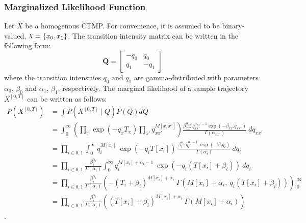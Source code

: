 \subsubsection{Marginalized Likelihood Function} 
Let $ X $ be a homogenous CTMP. For convenience, it is assumed to be binary-valued, $ \rchi = \left\lbrace x_{0}, x_{1} \right\rbrace $. The transition intensity matrix can be written in the following form:
\begin{equation}
\textbf{Q} = 
\begin{bmatrix}
-q_{0} & q_{0} \\
q_{1} & -q_{1}
\end{bmatrix}
\end{equation}
where the transition intensities $ q_{0} $ and $ q_{1} $ are gamma-distributed with parameters $ \alpha_{0}$, $ \beta_{0} $ and $ \alpha_{1} $, $ \beta_{1} $, respectively. The marginal likelihood of a sample trajectory $ X^{[0,T]} $ can be written as follows:
\begin{align}
P(X^{[0, T]}) & = \int  P(X^{[0, T]}\mid Q)P(Q) dQ \nonumber\\ & = \int_{0}^{\infty} \left( \prod_{x} \exp(-q_{x}T_{x}) \prod_{x'} q_{xx'}^{M[x, x']}\right) \frac{\beta_{xx'}^{\alpha_{xx'}}{q_{xx'}^{\alpha_{xx'}-1}}\exp(-\beta_{xx'}q_{xx'})}{\Gamma(\alpha_{xx'})} \ dq_{xx'} \nonumber\\ & = \prod_{i\in{0,1}}\int_{0}^{\infty} q_{i}^{M[x_{i}]} \ \exp(-q_{i}T[x_{i}]) \  \frac{\beta_{i}^{\alpha_{i}} \ q_{i}^{\alpha_{i}-1}\ \exp(-\beta_{i}q_{i})}{\Gamma(\alpha_{i})} \ dq_{i} \nonumber\\ & = \prod_{i\in{0,1}} \frac{\beta_{i}^{\alpha_{i}}}{\Gamma(\alpha_{i})} \int_{0}^{\infty} q_{i}^{M[x_{i}] + \alpha_{i} -1} \ \exp(-q_{i}(T[x_{i}]+\beta_{i})) \ dq_{i} \\ & = \prod_{i\in{0,1}} \frac{\beta_{i}^{\alpha_{i}}}{\Gamma(\alpha_{i})} \left( -(T_{i}+\beta_{i})^{M[x_{i}] + \alpha_{i}}\ \Gamma(M[x_{i}] + \alpha_{i}, \ q_{i}(T[x_{i}]+\beta_{i})) \right) \Big|_0^\infty  \\ & = \prod_{i\in{0,1}} \frac{\beta_{i}^{\alpha_{i}}}{\Gamma(\alpha_{i})} \left( (T[x_{i}]+\beta_{i})^{M[x_{i}] + \alpha_{i}}\ \Gamma(M[x_{i}] + \alpha_{i}) \right)
\label{eq:Marg_traj}
\end{align}.
%

